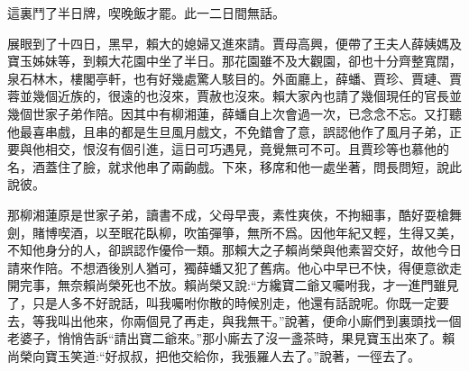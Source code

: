 \begin{parag}
    這裏鬥了半日牌，喫晚飯才罷。此一二日間無話。
\end{parag}


\begin{parag}
    展眼到了十四日，黑早，賴大的媳婦又進來請。賈母高興，便帶了王夫人薛姨媽及寶玉姊妹等，到賴大花園中坐了半日。那花園雖不及大觀園，卻也十分齊整寬闊，泉石林木，樓閣亭軒，也有好幾處驚人駭目的。外面廳上，薛蟠、賈珍、賈璉、賈蓉並幾個近族的，很遠的也沒來，賈赦也沒來。賴大家內也請了幾個現任的官長並幾個世家子弟作陪。因其中有柳湘蓮，薛蟠自上次會過一次，已念念不忘。又打聽他最喜串戲，且串的都是生旦風月戲文，不免錯會了意，誤認他作了風月子弟，正要與他相交，恨沒有個引進，這日可巧遇見，竟覺無可不可。且賈珍等也慕他的名，酒蓋住了臉，就求他串了兩齣戲。下來，移席和他一處坐著，問長問短，說此說彼。
\end{parag}


\begin{parag}
    那柳湘蓮原是世家子弟，讀書不成，父母早喪，素性爽俠，不拘細事，酷好耍槍舞劍，賭博喫酒，以至眠花臥柳，吹笛彈箏，無所不爲。因他年紀又輕，生得又美，不知他身分的人，卻誤認作優伶一類。那賴大之子賴尚榮與他素習交好，故他今日請來作陪。不想酒後別人猶可，獨薛蟠又犯了舊病。他心中早已不快，得便意欲走開完事，無奈賴尚榮死也不放。賴尚榮又說:“方纔寶二爺又囑咐我，才一進門雖見了，只是人多不好說話，叫我囑咐你散的時候別走，他還有話說呢。你既一定要去，等我叫出他來，你兩個見了再走，與我無干。”說著，便命小廝們到裏頭找一個老婆子，悄悄告訴“請出寶二爺來。”那小廝去了沒一盞茶時，果見寶玉出來了。賴尚榮向寶玉笑道:“好叔叔，把他交給你，我張羅人去了。”說著，一徑去了。
\end{parag}



